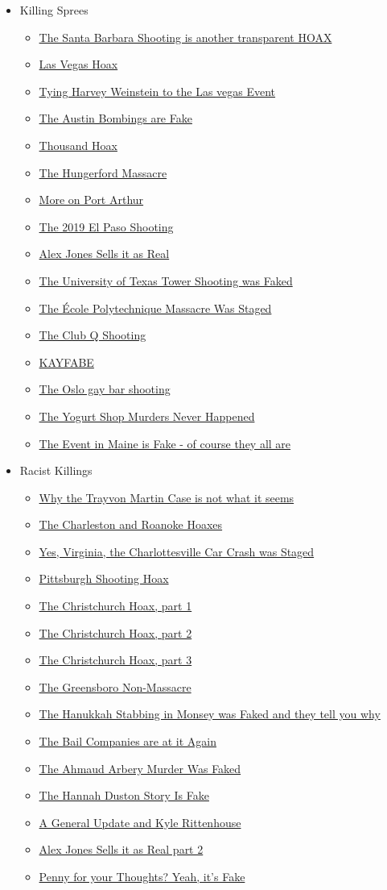 \documentclass{article}
\newcommand{\insertmydocument}[2]{ %
  \item \href{http://www.mileswmathis.com/#2}{#1}
}
\begin{document}
\begin{itemize}
\begin{itemize}
    \item Killing Sprees
    \begin{itemize}

      \insertmydocument{The Santa Barbara Shooting is another transparent HOAX}{sb.pdf}
      \insertmydocument{Las Vegas Hoax}{lasveg.pdf}
      \insertmydocument{Tying Harvey Weinstein to the Las vegas Event}{wein.pdf}
      \insertmydocument{The Austin Bombings are Fake}{austin.pdf}
      \insertmydocument{Thousand Hoax}{border.pdf}
      \insertmydocument{The Hungerford Massacre}{lestrade.pdf}
      \insertmydocument{More on Port Arthur}{porta.pdf}
      \insertmydocument{The 2019 El Paso Shooting}{elpaso.pdf}
      \insertmydocument{Alex Jones Sells it as Real}{alexsells.pdf}
      \insertmydocument{The University of Texas Tower Shooting was Faked}{chaswhit.pdf}
      \insertmydocument{The École Polytechnique Massacre Was Staged}{ecole.pdf}
      \insertmydocument{The Club Q Shooting}{aldrich.pdf}
      \insertmydocument{KAYFABE}{idaho.pdf}
      \insertmydocument{The Oslo gay bar shooting}{oslo2.pdf}
      \insertmydocument{The Yogurt Shop Murders Never Happened}{froyo.pdf}
      \insertmydocument{The Event in Maine is Fake -  of course they all are}{card.pdf}
    \end{itemize}

    \item Racist Killings
    \begin{itemize}

      \insertmydocument{Why the Trayvon Martin Case is not what it seems}{trayvon.pdf}
      \insertmydocument{The Charleston and Roanoke Hoaxes}{roanoke.pdf}
      \insertmydocument{Yes, Virginia, the Charlottesville Car Crash was Staged}{charl.pdf}
      \insertmydocument{Pittsburgh Shooting Hoax}{synag.pdf}
      \insertmydocument{The Christchurch Hoax, part 1}{xchurch.pdf}
      \insertmydocument{The Christchurch Hoax, part 2}{xchurch2.pdf}
      \insertmydocument{The Christchurch Hoax, part 3}{xchurch3.pdf}
      \insertmydocument{The Greensboro Non-Massacre}{gboro.pdf}
      \insertmydocument{The Hanukkah Stabbing in Monsey was Faked and they tell you why}{hanuk.pdf}
      \insertmydocument{The Bail Companies are at it Again}{bail.pdf}
      \insertmydocument{The Ahmaud Arbery Murder Was Faked}{maud.pdf}
      \insertmydocument{The Hannah Duston Story Is Fake}{duston.pdf}
      \insertmydocument{A General Update and Kyle Rittenhouse}{genup.pdf}
      \insertmydocument{Alex Jones Sells it as Real part 2}{alex2.pdf}
      \insertmydocument{Penny for your Thoughts? Yeah, it's Fake}{penny.pdf}
    \end{itemize}


\end{itemize}
\end{itemize}
\end{document}
